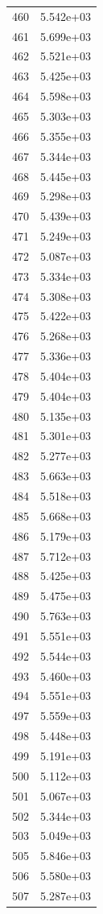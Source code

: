 \documentclass[12pt]{article}
\begin{document}
\begin{longtable}{@{}cc@{}}
460 & 5.542e+03 \\
461 & 5.699e+03 \\
462 & 5.521e+03 \\
463 & 5.425e+03 \\
464 & 5.598e+03 \\
465 & 5.303e+03 \\
466 & 5.355e+03 \\
467 & 5.344e+03 \\
468 & 5.445e+03 \\
469 & 5.298e+03 \\
470 & 5.439e+03 \\
471 & 5.249e+03 \\
472 & 5.087e+03 \\
473 & 5.334e+03 \\
474 & 5.308e+03 \\
475 & 5.422e+03 \\
476 & 5.268e+03 \\
477 & 5.336e+03 \\
478 & 5.404e+03 \\
479 & 5.404e+03 \\
480 & 5.135e+03 \\
481 & 5.301e+03 \\
482 & 5.277e+03 \\
483 & 5.663e+03 \\
484 & 5.518e+03 \\
485 & 5.668e+03 \\
486 & 5.179e+03 \\
487 & 5.712e+03 \\
488 & 5.425e+03 \\
489 & 5.475e+03 \\
490 & 5.763e+03 \\
491 & 5.551e+03 \\
492 & 5.544e+03 \\
493 & 5.460e+03 \\
494 & 5.551e+03 \\
497 & 5.559e+03 \\
498 & 5.448e+03 \\
499 & 5.191e+03 \\
500 & 5.112e+03 \\
501 & 5.067e+03 \\
502 & 5.344e+03 \\
503 & 5.049e+03 \\
505 & 5.846e+03 \\
506 & 5.580e+03 \\
507 & 5.287e+03 \\

\end{longtable}
\end{document}
